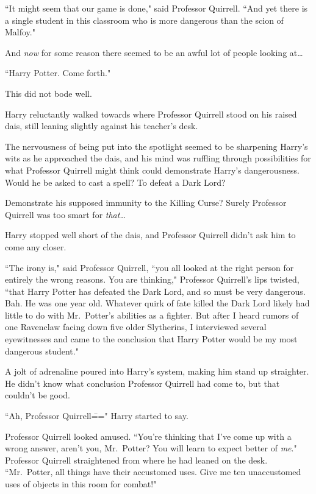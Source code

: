 ``It might seem that our game is done," said Professor Quirrell. ``And yet there is a single student in this classroom who is more dangerous than the scion of Malfoy."

And \emph{now} for some reason there seemed to be an awful lot of people looking at{\ldots}

``Harry Potter. Come forth."

This did not bode well.

Harry reluctantly walked towards where Professor Quirrell stood on his raised dais, still leaning slightly against his teacher's desk.

The nervousness of being put into the spotlight seemed to be sharpening Harry's wits as he approached the dais, and his mind was ruffling through possibilities for what Professor Quirrell might think could demonstrate Harry's dangerousness. Would he be asked to cast a spell? To defeat a Dark Lord?

Demonstrate his supposed immunity to the Killing Curse? Surely Professor Quirrell was too smart for \emph{that}{\ldots}

Harry stopped well short of the dais, and Professor Quirrell didn't ask him to come any closer.

``The irony is," said Professor Quirrell, ``you all looked at the right person for entirely the wrong reasons. You are thinking," Professor Quirrell's lips twisted, ``that Harry Potter has defeated the Dark Lord, and so must be very dangerous. Bah. He was one year old. Whatever quirk of fate killed the Dark Lord likely had little to do with Mr.~Potter's abilities as a fighter. But after I heard rumors of one Ravenclaw facing down five older Slytherins, I interviewed several eyewitnesses and came to the conclusion that Harry Potter would be my most dangerous student."

A jolt of adrenaline poured into Harry's system, making him stand up straighter. He didn't know what conclusion Professor Quirrell had come to, but that couldn't be good.

``Ah, Professor Quirrell\===" Harry started to say.

Professor Quirrell looked amused. ``You're thinking that I've come up with a wrong answer, aren't you, Mr.~Potter? You will learn to expect better of \emph{me}." Professor Quirrell straightened from where he had leaned on the desk. ``Mr.~Potter, all things have their accustomed uses. Give me ten unaccustomed uses of objects in this room for combat!"

